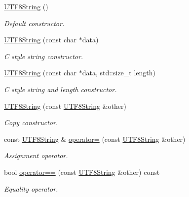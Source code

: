 \begin{DoxyCompactItemize}
\item 
\hyperlink{classchaos_1_1uni_1_1_u_t_f8_string_a09647f0ade81a97ed55c75b9070b07a3}{U\-T\-F8\-String} ()
\begin{DoxyCompactList}\small\item\em Default constructor. \end{DoxyCompactList}\item 
\hyperlink{classchaos_1_1uni_1_1_u_t_f8_string_abb9cf9e655e1285179e47c698cfb1c56}{U\-T\-F8\-String} (const char $\ast$data)
\begin{DoxyCompactList}\small\item\em C style string constructor. \end{DoxyCompactList}\item 
\hyperlink{classchaos_1_1uni_1_1_u_t_f8_string_a2f9c060bed3206c69d2ab05f37e07b8c}{U\-T\-F8\-String} (const char $\ast$data, std\-::size\-\_\-t length)
\begin{DoxyCompactList}\small\item\em C style string and length constructor. \end{DoxyCompactList}\item 
\hyperlink{classchaos_1_1uni_1_1_u_t_f8_string_adabf7e6406a70581690a2b190143d01d}{U\-T\-F8\-String} (const \hyperlink{classchaos_1_1uni_1_1_u_t_f8_string}{U\-T\-F8\-String} \&other)
\begin{DoxyCompactList}\small\item\em Copy constructor. \end{DoxyCompactList}\item 
const \hyperlink{classchaos_1_1uni_1_1_u_t_f8_string}{U\-T\-F8\-String} \& \hyperlink{classchaos_1_1uni_1_1_u_t_f8_string_a9ff3d9661b17bbc979cc82d967c76c13}{operator=} (const \hyperlink{classchaos_1_1uni_1_1_u_t_f8_string}{U\-T\-F8\-String} \&other)
\begin{DoxyCompactList}\small\item\em Assignment operator. \end{DoxyCompactList}\item 
bool \hyperlink{classchaos_1_1uni_1_1_u_t_f8_string_af6f79ccd70af381eb6feba5fe3a3b2d0}{operator==} (const \hyperlink{classchaos_1_1uni_1_1_u_t_f8_string}{U\-T\-F8\-String} \&other) const 
\begin{DoxyCompactList}\small\item\em Equality operator. \end{DoxyCompactList}\item 

\end{DoxyCompactItemize}
